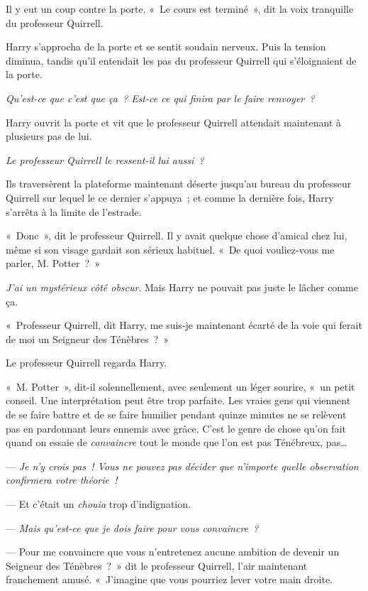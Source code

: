 Il y eut un coup contre la porte.
«~Le cours est terminé~», dit la voix tranquille du professeur Quirrell.

Harry s'approcha de la porte et se sentit soudain nerveux.
Puis la tension diminua, tandis qu'il entendait les pas du professeur Quirrell qui s'éloignaient de la porte.

\emph{Qu'est-ce que c'est que ça~?
Est-ce ce qui finira par le faire renvoyer~?}

Harry ouvrit la porte et vit que le professeur Quirrell attendait maintenant à plusieurs pas de lui.

\emph{Le professeur Quirrell le ressent-il lui aussi~?}

Ils traversèrent la plateforme maintenant déserte jusqu'au bureau du professeur Quirrell sur lequel le ce dernier s'appuya~; et comme la dernière fois, Harry s'arrêta à la limite de l'estrade.

«~Donc~», dit le professeur Quirrell.
Il y avait quelque chose d'amical chez lui, même si son visage gardait son sérieux habituel.
«~De quoi vouliez-vous me parler, M. Potter~?~»

\emph{J'ai un mystérieux côté obscur}.
Mais Harry ne pouvait pas juste le lâcher comme ça.

«~Professeur Quirrell, dit Harry, me suis-je maintenant écarté de la voie qui ferait de moi un Seigneur des Ténèbres~?~»

Le professeur Quirrell regarda Harry.

«~M. Potter~», dit-il solennellement, avec seulement un léger sourire, «~un petit conseil.
Une interprétation peut être trop parfaite.
Les vraies gens qui viennent de se faire battre et de se faire humilier pendant quinze minutes ne se relèvent pas en pardonnant leurs ennemis avec grâce.
C'est le genre de chose qu'on fait quand on essaie de \emph{convaincre} tout le monde que l'on est pas Ténébreux, pas…

--- \emph{Je n'y crois pas~!
Vous ne pouvez pas décider que n'importe quelle observation confirmera votre théorie~!}

--- Et c'était un \emph{chouia} trop d'indignation.

--- \emph{Mais qu'est-ce que je dois faire pour vous convaincre~?}

--- Pour me convaincre que vous n'entretenez aucune ambition de devenir un Seigneur des Ténèbres~?~»
dit le professeur Quirrell, l'air maintenant franchement amusé.
«~J'imagine que vous pourriez lever votre main droite.

